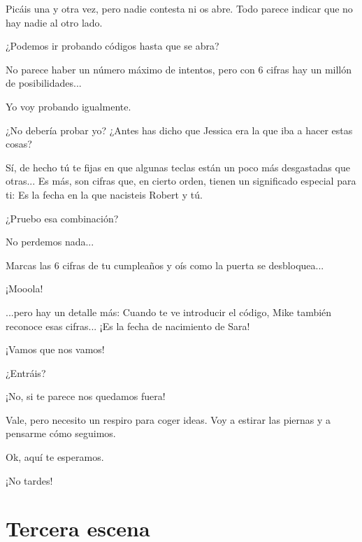 \documentclass[10pt, a5paper, twocolumn]{article}
\newenvironment{dialogue}
    {\begin{description}[leftmargin=!,align=right,labelwidth=0.cm]}
    {\end{description}}
\newcommand\A{\item[\raisebox{-0.25em}{\scalebox{0.75}{\bctetraedre}}]}
\newcommand\B{\item[\raisebox{-0.25em}{\scalebox{0.75}{\bccube}}]}
\newcommand\E{\item[\raisebox{-0.25em}{\scalebox{0.75}{\bcicosaedre}}]}
\begin{document}
\begin{dialogue}
        \E Picáis una y otra vez, pero nadie contesta ni os abre. Todo parece indicar que no hay nadie al otro lado.
        \B ¿Podemos ir probando códigos hasta que se abra?
        \E No parece haber un número máximo de intentos, pero con 6 cifras hay un millón de posibilidades...
        \B Yo voy probando igualmente.
        \A ¿No debería probar yo? ¿Antes has dicho que Jessica era la que iba a hacer estas cosas?
        \E Sí, de hecho tú te fijas en que algunas teclas están un poco más desgastadas que otras... Es más, son cifras que, en cierto orden, tienen un significado especial para ti: Es la fecha en la que nacisteis Robert y tú.
        \A ¿Pruebo esa combinación?
        \B No perdemos nada...
        \E Marcas las 6 cifras de tu cumpleaños y oís como la puerta se desbloquea...
        \A ¡Mooola!
        \E ...pero hay un detalle más: Cuando te ve introducir el código, Mike también reconoce esas cifras... ¡Es la fecha de nacimiento de Sara!
        \B ¡Vamos que nos vamos!
        \E ¿Entráis?
        \A ¡No, si te parece nos quedamos fuera!
        \E Vale, pero necesito un respiro para coger ideas. Voy a estirar las piernas y a pensarme cómo seguimos.
        \B Ok, aquí te esperamos.
        \A ¡No tardes!
    \end{dialogue}

    \section*{Tercera escena} %
\end{document}
